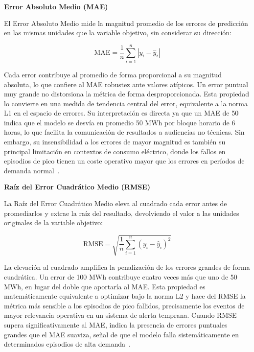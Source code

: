 \documentclass[12pt, a4paper]{article}
\begin{document}
\textbf{Error Absoluto Medio (MAE)}

El Error Absoluto Medio mide la magnitud promedio de los errores de predicción en las mismas unidades que la variable objetivo, sin considerar su dirección:

\begin{equation}
\text{MAE} = \frac{1}{n} \sum_{i=1}^{n} |y_i - \hat{y}_i|
\end{equation}

Cada error contribuye al promedio de forma proporcional a su magnitud absoluta, lo que confiere al MAE robustez ante valores atípicos. Un error puntual muy grande no distorsiona la métrica de forma desproporcionada. Esta propiedad lo convierte en una medida de tendencia central del error, equivalente a la norma L1 en el espacio de errores. Su interpretación es directa ya que un MAE de 50 indica que el modelo se desvía en promedio 50 MWh por bloque horario de 6 horas, lo que facilita la comunicación de resultados a audiencias no técnicas. Sin embargo, su insensibilidad a los errores de mayor magnitud es también su principal limitación en contextos de consumo eléctrico, donde los fallos en episodios de pico tienen un coste operativo mayor que los errores en períodos de demanda normal~\cite{gassar2024, rubattu2023}.

\textbf{Raíz del Error Cuadrático Medio (RMSE)}

La Raíz del Error Cuadrático Medio eleva al cuadrado cada error antes de promediarlos y extrae la raíz del resultado, devolviendo el valor a las unidades originales de la variable objetivo:

\begin{equation}
\text{RMSE} = \sqrt{\frac{1}{n} \sum_{i=1}^{n} (y_i - \hat{y}_i)^2}
\end{equation}

La elevación al cuadrado amplifica la penalización de los errores grandes de forma cuadrática. Un error de 100 MWh contribuye cuatro veces más que uno de 50 MWh, en lugar del doble que aportaría al MAE. Esta propiedad es matemáticamente equivalente a optimizar bajo la norma L2 y hace del RMSE la métrica más sensible a los episodios de pico fallidos, precisamente los eventos de mayor relevancia operativa en un sistema de alerta temprana. Cuando RMSE supera significativamente al MAE, indica la presencia de errores puntuales grandes que el MAE suaviza, señal de que el modelo falla sistemáticamente en determinados episodios de alta demanda~\cite{gassar2024, rubattu2023}.
\end{document}
